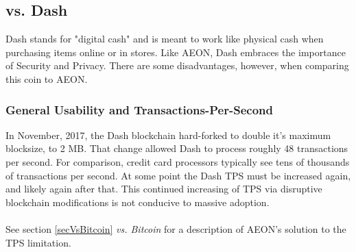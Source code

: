 \subsection{vs. Dash}
Dash stands for "digital cash" and is meant to work like physical cash when purchasing items online or in stores.  Like AEON, Dash embraces the importance of Security and Privacy.  There are some disadvantages, however, when comparing this coin to AEON.

\subsubsection{General Usability and Transactions-Per-Second}
In November, 2017, the Dash blockchain hard-forked to double it's maximum blocksize, to 2 MB. That change allowed Dash to process roughly 48 transactions per second.  For comparison, credit card processors typically see tens of thousands of transactions per second.  At some point the Dash TPS must be increased again, and likely again after that.  This continued increasing of TPS via disruptive blockchain modifications is not conducive to massive adoption.\\
\\
See section \ref{secVsBitcoin} \textit{vs. Bitcoin} for a description of AEON's solution to the TPS limitation.

